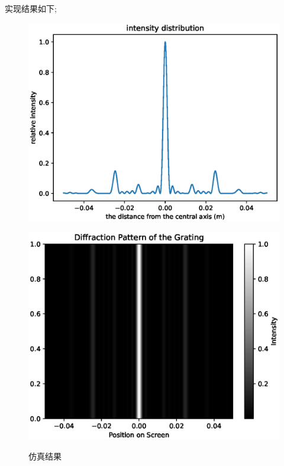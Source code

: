\documentclass[UTF8]{ctexart}
\begin{document}
    实现结果如下;
    \begin{figure}[h]
        \centering
        \begin{minipage}[b]{0.4\textwidth}
            \centering
            \includegraphics[height=0.28 \textheight]{problem4_e(i)_1}
            \label{fig:figure4.5.1.1}
        \end{minipage}
        \hfill
        \begin{minipage}[t]{0.4\textwidth}
            \centering
            \includegraphics[height=0.32 \textheight]{problem4_e(i)_2}
            \label{fig:figure4.5.1.2}
        \end{minipage}
        \caption{仿真结果}
    \end{figure}
\end{document}
